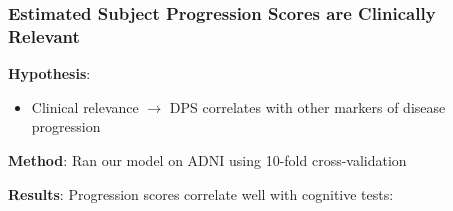 \documentclass[8pt,xcolor=table]{beamer}
\begin{document}
\begin{frame}
\frametitle{Estimated Subject Progression Scores are Clinically Relevant}

\vspace{-2em}

\textbf{Hypothesis}: 
\begin{itemize}
 \item Clinical relevance $\rightarrow$ DPS correlates with other markers of disease progression
\end{itemize}

\vfill

\textbf{Method}: Ran our model on ADNI using 10-fold cross-validation

\vfill

\textbf{Results}: Progression scores correlate well with cognitive tests:



\newcommand{\figFont}{\small}
\newcommand{\pValFont}{\tiny}


\end{frame}
\end{document}

